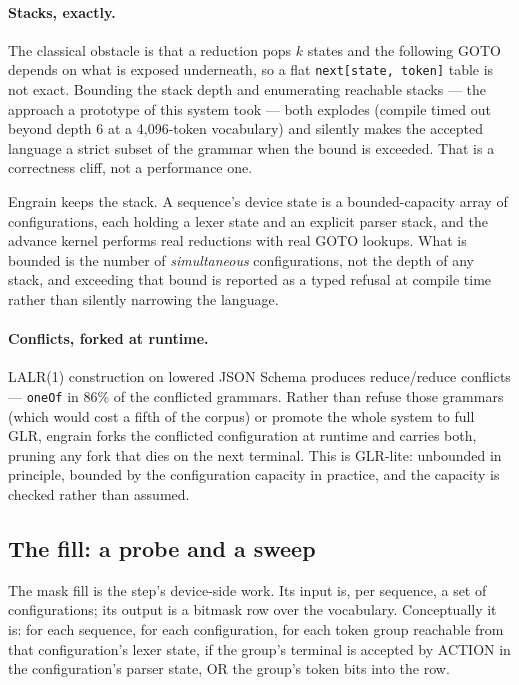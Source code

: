 \documentclass{article}
\begin{document}
\paragraph{Stacks, exactly.} The classical obstacle is that a reduction pops
$k$ states and the following GOTO depends on what is exposed underneath, so a
flat \texttt{next[state, token]} table is not exact. Bounding the stack depth
and enumerating reachable stacks --- the approach a prototype of this system
took --- both explodes (compile timed out beyond depth 6 at a 4{,}096-token
vocabulary) and silently makes the accepted language a strict subset of the
grammar when the bound is exceeded. That is a correctness cliff, not a
performance one.

Engrain keeps the stack. A sequence's device state is a bounded-capacity array
of configurations, each holding a lexer state and an explicit parser stack, and
the advance kernel performs real reductions with real GOTO lookups. What is
bounded is the number of \emph{simultaneous} configurations, not the depth of
any stack, and exceeding that bound is reported as a typed refusal at compile
time rather than silently narrowing the language.

\paragraph{Conflicts, forked at runtime.} LALR(1) construction on lowered JSON
Schema produces reduce/reduce conflicts --- \texttt{oneOf} in 86\% of the
conflicted grammars. Rather than refuse those grammars (which would cost a fifth
of the corpus) or promote the whole system to full GLR, engrain forks the
conflicted configuration at runtime and carries both, pruning any fork that dies
on the next terminal. This is GLR-lite: unbounded in principle, bounded by the
configuration capacity in practice, and the capacity is checked rather than
assumed.

\subsection{The fill: a probe and a sweep}
\label{sec:fill}

The mask fill is the step's device-side work. Its input is, per sequence, a set
of configurations; its output is a bitmask row over the vocabulary. Conceptually
it is: for each sequence, for each configuration, for each token group reachable
from that configuration's lexer state, if the group's terminal is accepted by
ACTION in the configuration's parser state, OR the group's token bits into the
row.
\end{document}
